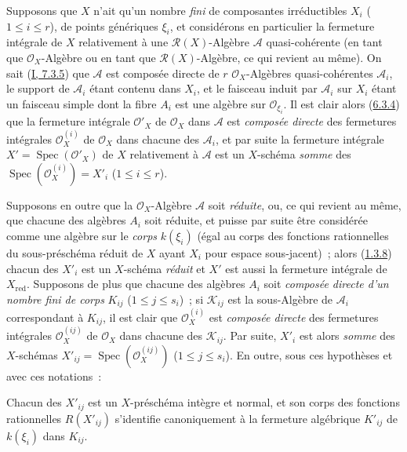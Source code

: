 \begin{env}[6.3.6]
\label{II.6.3.6-fr}
Supposons que $X$ n'ait qu'un nombre \emph{fini} de composantes irréductibles
$X_i$ ($1\leq i\leq r$), de points génériques $\xi_i$, et considérons en
particulier la fermeture intégrale de $X$ relativement à une
$\mathcal{R}(X)$-Algèbre $\mathcal{A}$ quasi-cohérente (en tant que
$\mathcal{O}_X$-Algèbre ou en tant que $\mathcal{R}(X)$-Algèbre, ce qui
revient au même). On sait (\hyperref[I.7.3.5-fr]{I, 7.3.5}) que
$\mathcal{A}$ est composée directe de $r$ $\mathcal{O}_X$-Algèbres
quasi-cohérentes $\mathcal{A}_i$, le support de $\mathcal{A}_i$ étant contenu
dans $X_i$, et le faisceau induit par $\mathcal{A}_i$ sur $X_i$ étant un
faisceau simple dont la fibre $A_i$ est une algèbre sur
$\mathcal{O}_{\xi_i}$. Il est clair alors (\hyperref[II.6.3.4-fr]{6.3.4}) que
la fermeture intégrale $\mathcal{O}'_X$ de $\mathcal{O}_X$ dans
$\mathcal{A}$ est \emph{composée directe} des fermetures intégrales
$\mathcal{O}^{(i)}_X$ de $\mathcal{O}_X$ dans chacune des $\mathcal{A}_i$, et
par suite la fermeture intégrale $X'=\operatorname{Spec}(\mathcal{O}'_X)$ de
$X$ relativement à $\mathcal{A}$ est un $X$-schéma \emph{somme} des
$\operatorname{Spec}(\mathcal{O}^{(i)}_X)=X'_i$ ($1\leq i\leq r$).

Supposons en outre que la $\mathcal{O}_X$-Algèbre $\mathcal{A}$ soit
\emph{réduite}, ou, ce qui revient au même, que chacune des algèbres $A_i$
soit réduite, et puisse par suite être considérée comme une algèbre sur le
\emph{corps} $k(\xi_i)$ (égal au corps des fonctions rationnelles du
sous-préschéma réduit de $X$ ayant $X_i$ pour espace sous-jacent)~; alors
(\hyperref[II.1.3.8-fr]{1.3.8}) chacun des $X'_i$ est un $X$-schéma
\emph{réduit} et $X'$ est aussi la fermeture intégrale de $X_{\mathrm{red}}$.
Supposons de plus que chacune des algèbres $A_i$ soit \emph{composée directe
d'un nombre fini de corps} $K_{ij}$ ($1\leq j\leq s_i$)~; si
$\mathcal{K}_{ij}$ est la sous-Algèbre de $\mathcal{A}_i$ correspondant à
$K_{ij}$, il est clair que $\mathcal{O}^{(i)}_X$ est \emph{composée directe}
des fermetures intégrales $\mathcal{O}^{(ij)}_X$ de $\mathcal{O}_X$ dans
chacune des $\mathcal{K}_{ij}$. Par suite, $X'_i$ est alors \emph{somme} des
$X$-schémas $X'_{ij}=\operatorname{Spec}(\mathcal{O}^{(ij)}_X)$
($1\leq j\leq s_i$). En outre, sous ces hypothèses et avec ces notations~:
\end{env}


\begin{proposition}[6.3.7]
\label{II.6.3.7-fr}
Chacun des $X'_{ij}$ est un $X$-préschéma intègre et normal, et son corps des
fonctions rationnelles $R(X'_{ij})$ s'identifie canoniquement à la fermeture
algébrique $K'_{ij}$ de $k(\xi_i)$ dans $K_{ij}$.
\end{proposition}

